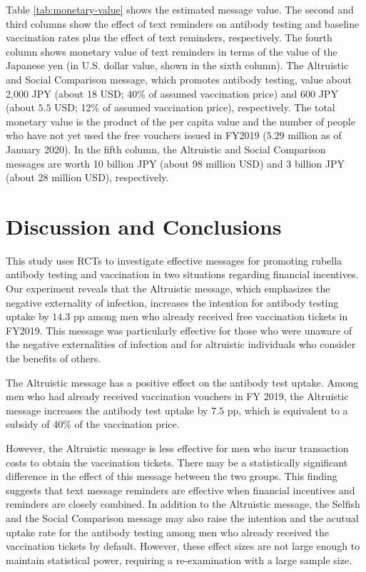 \documentclass[
]{article}
\begin{document}
Table \ref{tab:monetary-value} shows the estimated message value. The second and third columns show the effect of text reminders on antibody testing and baseline vaccination rates plus the effect of text reminders, respectively. The fourth column shows monetary value of text reminders in terms of the value of the Japanese yen (in U.S. dollar value, shown in the sixth column). The Altruistic and Social Comparison message, which promotes antibody testing, value about 2,000 JPY (about 18 USD; 40\% of assumed vaccination price) and 600 JPY (about \(5.5\) USD; 12\% of assumed vaccination price), respectively. The total monetary value is the product of the per capita value and the number of people who have not yet used the free vouchers issued in FY2019 (\(5.29\) million as of January 2020). In the fifth column, the Altruistic and Social Comparison messages are worth 10 billion JPY (about 98 million USD) and 3 billion JPY (about 28 million USD), respectively.

\hypertarget{conclusion}{%
\section{Discussion and Conclusions}\label{conclusion}}

This study uses RCTs to investigate effective messages for promoting rubella antibody testing and vaccination in two situations regarding financial incentives. Our experiment reveals that the Altruistic message, which emphasizes the negative externality of infection, increases the intention for antibody testing uptake by \(14.3\) pp among men who already received free vaccination tickets in FY2019. This message was particularly effective for those who were unaware of the negative externalities of infection and for altruistic individuals who consider the benefits of others.

The Altruistic message has a positive effect on the antibody test uptake. Among men who had already received vaccination vouchers in FY 2019, the Altruistic message increases the antibody test uptake by \(7.5\) pp, which is equivalent to a subsidy of 40\% of the vaccination price.

However, the Altruistic message is less effective for men who incur transaction costs to obtain the vaccination tickets. There may be a statistically significant difference in the effect of this message between the two groups. This finding suggests that text message reminders are effective when financial incentives and reminders are closely combined. In addition to the Altruistic message, the Selfish and the Social Comparison message may also raise the intention and the acutual uptake rate for the antibody testing among men who already received the vaccination tickets by default. However, these effect sizes are not large enough to maintain statistical power, requiring a re-examination with a large sample size.
\end{document}
